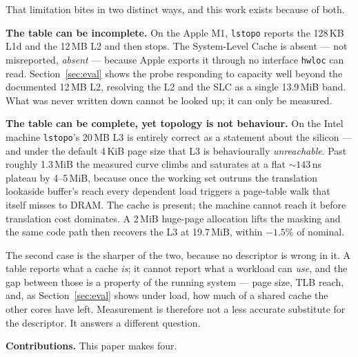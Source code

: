\documentclass[conference]{IEEEtran}
\begin{document}
That limitation bites in two distinct ways, and this work exists because of both.

\textbf{The table can be incomplete.} On the Apple M1, \texttt{lstopo} reports the
128\,KB L1d and the 12\,MB L2 and then stops. The System-Level Cache is absent
--- not misreported, \emph{absent} --- because Apple exports it through no
interface \texttt{hwloc} can read. Section~\ref{sec:eval} shows the probe
responding to capacity well beyond the documented 12\,MB L2, resolving the L2 and
the SLC as a single 13.9\,MiB band. What was never written down cannot be looked
up; it can only be measured.

\textbf{The table can be complete, yet topology is not behaviour.} On the Intel
machine \texttt{lstopo}'s 20\,MB L3 is entirely correct as a statement about the
silicon --- and under the default 4\,KiB page size that L3 is behaviourally
\emph{unreachable}. Past roughly 1.3\,MiB the measured curve climbs and saturates
at a flat ${\sim}143$\,ns plateau by 4--5\,MiB, because once the working set
outruns the translation lookaside buffer's reach every dependent load triggers a
page-table walk that itself misses to DRAM. The cache is present; the machine
cannot reach it before translation cost dominates. A 2\,MiB huge-page allocation
lifts the masking and the same code path then recovers the L3 at 19.7\,MiB, within
$-1.5\%$ of nominal.

The second case is the sharper of the two, because no descriptor is wrong in it. A
table reports what a cache \emph{is}; it cannot report what a workload can
\emph{use}, and the gap between those is a property of the running system ---
page size, TLB reach, and, as Section~\ref{sec:eval} shows under load, how much of
a shared cache the other cores have left. Measurement is therefore not a less
accurate substitute for the descriptor. It answers a different question.

\textbf{Contributions.} This paper makes four.
\end{document}
